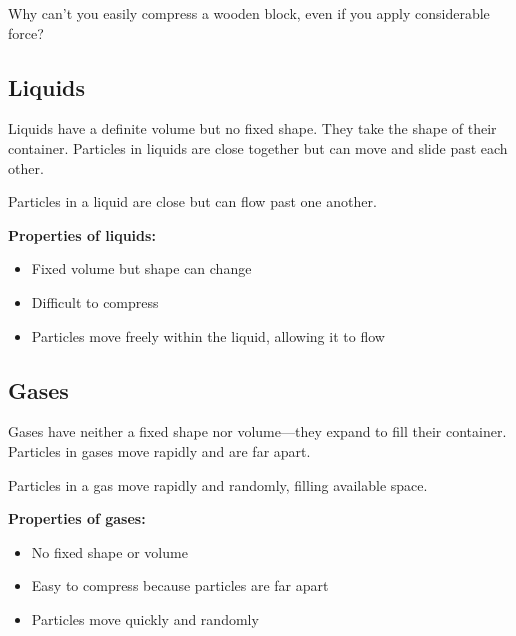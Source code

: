 \begin{stopandthink}
Why can't you easily compress a wooden block, even if you apply considerable force?
\end{stopandthink}

\subsection{Liquids}

Liquids have a definite volume but no fixed shape. They take the shape of their container. Particles in liquids are close together but can move and slide past each other.

\begin{marginfigure}
\caption{Particles in a liquid are close but can flow past one another.}
\end{marginfigure}

\textbf{Properties of liquids:}
\begin{itemize}
    \item Fixed volume but shape can change
    \item Difficult to compress
    \item Particles move freely within the liquid, allowing it to flow
\end{itemize}

\subsection{Gases}

Gases have neither a fixed shape nor volume—they expand to fill their container. Particles in gases move rapidly and are far apart.

\begin{marginfigure}
\caption{Particles in a gas move rapidly and randomly, filling available space.}
\end{marginfigure}

\textbf{Properties of gases:}
\begin{itemize}
    \item No fixed shape or volume
    \item Easy to compress because particles are far apart
    \item Particles move quickly and randomly
\end{itemize}

